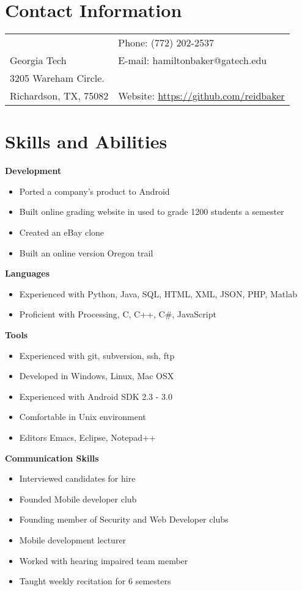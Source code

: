 \documentclass[margin,line]{res}
\begin{document}
 \hfill

\begin{resume}
\section{\sc Contact Information}
\vspace{.05in}
\begin{tabular}{@{}p{3.5in}p{3in}} & {Phone:}  (772) 202-2537 \\
Georgia Tech & {E-mail:}  hamiltonbaker@gatech.edu\\
3205 Wareham Circle. \\
Richardson, TX, 75082  & {Website:} \url{https://github.com/reidbaker}
\end{tabular}
 
\section{\sc Skills and Abilities}
 {\bf Development}
    \begin{itemize}
    \item Ported a company's product to Android
    \item Built online grading website in used to grade 1200 students a
      semester
    \item Created an eBay clone
    \item Built an online version Oregon trail
    \end{itemize}
 {\bf Languages}
    \begin{itemize}
    \item Experienced with Python, Java, SQL, HTML, XML, JSON,
      PHP, Matlab
    \item Proficient with Processing, C, C++, C\#, JavaScript
    \end{itemize}
 {\bf Tools}
    \begin{itemize}
    \item Experienced with git, subversion, ssh, ftp
    \item Developed in Windows, Linux, Mac OSX
    \item Experienced with Android SDK 2.3 - 3.0
    \item Comfortable in Unix environment
    \item Editors Emacs, Eclipse, Notepad++
    \end{itemize}
 {\bf Communication Skills}
    \begin{itemize}
    \item Interviewed candidates for hire
    \item Founded Mobile developer club
    \item Founding member of Security and Web Developer clubs
    \item Mobile development lecturer
    \item Worked with hearing impaired team member
    \item Taught weekly recitation for 6 semesters
    \end{itemize}

\end{resume}
\end{document}
